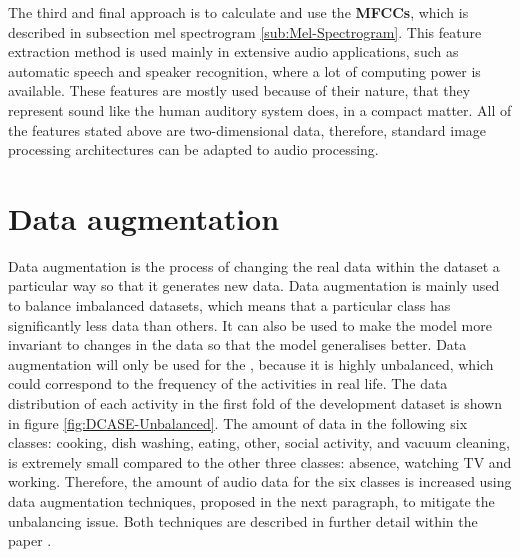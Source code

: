 \newline
\newline
The third and final approach is to calculate and use the \textbf{\glspl{MFCC}}, which is described in subsection mel spectrogram \ref{sub:Mel-Spectrogram}. This feature extraction method is used mainly in extensive audio applications, such as automatic speech and speaker recognition, where a lot of computing power is available. These features are mostly used because of their nature, that they represent sound like the human auditory system does, in a compact matter.
\newline
\newline
All of the features stated above are two-dimensional data, therefore, standard image processing architectures can be adapted to audio processing.

\section{Data augmentation}
\label{sec:Data-Augmentation}
Data augmentation is the process of changing the real data within the dataset a particular way so that it generates new data. Data augmentation is mainly used to balance imbalanced datasets, which means that a particular class has significantly less data than others. It can also be used to make the model more invariant to changes in the data so that the model generalises better.
\newline
\newline
Data augmentation will only be used for the , because it is highly unbalanced, which could correspond to the frequency of the activities in real life. The data distribution of each activity in the first fold of the development dataset is shown in figure \ref{fig:DCASE-Unbalanced}. The amount of data in the following six classes: cooking, dish washing, eating, other, social activity, and vacuum cleaning, is extremely small compared to the other three classes: absence, watching TV and working. Therefore, the amount of audio data for the six classes is increased using data augmentation techniques, proposed in the next paragraph, to mitigate the unbalancing issue. Both techniques are described in further detail within the paper \cite{inoue_domestic_2018}.
